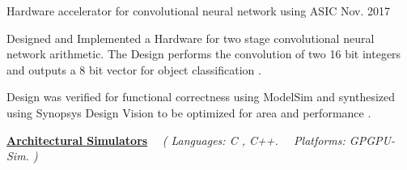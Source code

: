 \begin{cvprojects}
\begin{flushleft}
    \end{flushleft}
    \par\addvspace{0.3ex}
    \cvproject
    {Hardware accelerator for convolutional neural network using ASIC }
    {\color{darkgray}Nov. 2017}
    {
      \begin{cvprojectitems}
        \item {Designed and Implemented a Hardware for two stage convolutional neural network arithmetic. The Design performs the convolution of two 16 bit integers and outputs a 8 bit vector for object classification . }
        \item {Design was verified for functional correctness using ModelSim and synthesized using Synopsys Design Vision to be optimized for area and performance .} 
      \end{cvprojectitems}
    }

    \par\addvspace{2ex}
    \begin{flushleft}
    \par\addvspace{-1.5mm}
    \fontsize{10.4pt}{1em}\selectfont\underline{\textbf{\color{black}Architectural Simulators}} \ \ \textit{(\color{text} Languages: C , C++. \ \ Platforms: GPGPU-Sim. )}
    \end{flushleft}
    \par\addvspace{0.3ex}

\end{cvprojects}